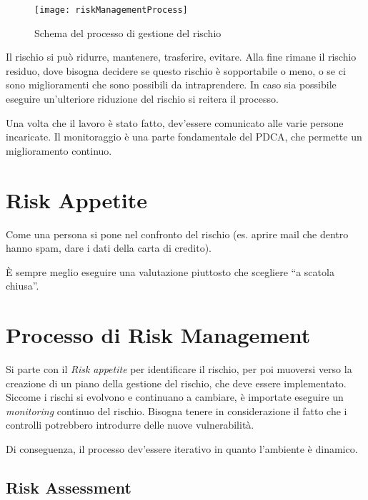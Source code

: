 \begin{figure}[H]
 \centering
 \texttt{[image: riskManagementProcess]}
 \caption{Schema del processo di gestione del rischio}
\end{figure}

Il rischio si può ridurre, mantenere, trasferire, evitare. Alla fine rimane il
rischio residuo, dove bisogna decidere se questo rischio è sopportabile o meno,
o se ci sono miglioramenti che sono possibili da intraprendere. In caso sia
possibile eseguire un'ulteriore riduzione del rischio si reitera il processo.

Una volta che il lavoro è stato fatto, dev'essere comunicato alle varie
persone incaricate. Il monitoraggio è una parte fondamentale del PDCA, che
permette un miglioramento continuo.

\section{Risk Appetite}

Come una persona si pone nel confronto del rischio (es. aprire mail che dentro
hanno spam, dare i dati della carta di credito).

È sempre meglio eseguire una valutazione piuttosto che scegliere
``a scatola chiusa''.


\section{Processo di Risk Management}

Si parte con il \textit{Risk appetite} per identificare il rischio, per poi
muoversi verso la creazione di un piano della gestione del rischio, che deve
essere implementato. Siccome i rischi si evolvono e continuano a
cambiare, è importate eseguire un \textit{monitoring} continuo del rischio.
Bisogna tenere in considerazione il fatto che i controlli potrebbero
introdurre delle nuove vulnerabilità.

Di conseguenza, il processo dev'essere iterativo in quanto l'ambiente è
dinamico.


\subsection{Risk Assessment}

